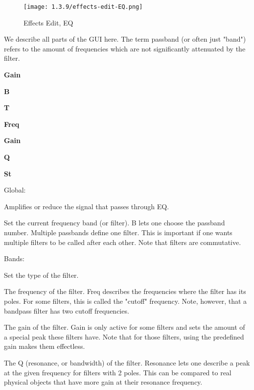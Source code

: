 \begin{figure}[H]
   \centering 
   \texttt{[image: 1.3.9/effects-edit-EQ.png]}
   \caption{Effects Edit, EQ}
   \label{fig:effects_edit_eq}
\end{figure}

   We describe all parts of the GUI here. The term passband (or often just
   "band") refers to the amount of frequencies which are not
   significantly attenuated by the filter.

   \begin{enumber}
      \item \textbf{Gain}
      \item \textbf{B}
      \item \textbf{T}
      \item \textbf{Freq}
      \item \textbf{Gain}
      \item \textbf{Q}
      \item \textbf{St}
   \end{enumber}

Global:

   \setcounter{ItemCounter}{0}      %

   Amplifies or reduce the signal that passes through EQ.

   Set the current frequency band (or filter).
   B lets one choose the passband number. Multiple passbands define one
   filter. This is important if one wants multiple filters to be called
   after each other. Note that filters are commutative.

Bands:

   Set the type of the filter.

   The frequency of the filter.
   Freq describes the frequencies where the filter has its poles. For some
   filters, this is called the "cutoff" frequency. Note, however, that a
   bandpass filter has two cutoff frequencies.

   The gain of the filter.
   Gain is only active for some filters and sets the amount of a special
   peak these filters have. Note that for those filters, using the
   predefined gain makes them effectless.

   The Q (resonance, or bandwidth) of the filter.
   Resonance lets one describe a peak at the given frequency for filters
   with 2 poles. This can be compared to real physical objects that have
   more gain at their resonance frequency.

